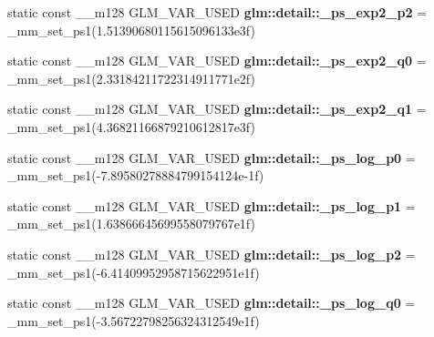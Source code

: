 \begin{DoxyCompactItemize}
\item 
\hypertarget{namespaceglm_1_1detail_a1f7d18bd6da7c5bdc5fe685841f8374f}{}static const \+\_\+\+\_\+m128 G\+L\+M\+\_\+\+V\+A\+R\+\_\+\+U\+S\+E\+D {\bfseries glm\+::detail\+::\+\_\+ps\+\_\+exp2\+\_\+p2} = \+\_\+mm\+\_\+set\+\_\+ps1(1.\+51390680115615096133e3f)\label{namespaceglm_1_1detail_a1f7d18bd6da7c5bdc5fe685841f8374f}

\item 
\hypertarget{namespaceglm_1_1detail_ab6388ad106523ea0b34984348ce3eaa0}{}static const \+\_\+\+\_\+m128 G\+L\+M\+\_\+\+V\+A\+R\+\_\+\+U\+S\+E\+D {\bfseries glm\+::detail\+::\+\_\+ps\+\_\+exp2\+\_\+q0} = \+\_\+mm\+\_\+set\+\_\+ps1(2.\+33184211722314911771e2f)\label{namespaceglm_1_1detail_ab6388ad106523ea0b34984348ce3eaa0}

\item 
\hypertarget{namespaceglm_1_1detail_a2792b1a9c82052110bf5c1daaa64ab42}{}static const \+\_\+\+\_\+m128 G\+L\+M\+\_\+\+V\+A\+R\+\_\+\+U\+S\+E\+D {\bfseries glm\+::detail\+::\+\_\+ps\+\_\+exp2\+\_\+q1} = \+\_\+mm\+\_\+set\+\_\+ps1(4.\+36821166879210612817e3f)\label{namespaceglm_1_1detail_a2792b1a9c82052110bf5c1daaa64ab42}

\item 
\hypertarget{namespaceglm_1_1detail_ac05e7617f086ccce8105e2ee2b9384b8}{}static const \+\_\+\+\_\+m128 G\+L\+M\+\_\+\+V\+A\+R\+\_\+\+U\+S\+E\+D {\bfseries glm\+::detail\+::\+\_\+ps\+\_\+log\+\_\+p0} = \+\_\+mm\+\_\+set\+\_\+ps1(-\/7.\+89580278884799154124e-\/1f)\label{namespaceglm_1_1detail_ac05e7617f086ccce8105e2ee2b9384b8}

\item 
\hypertarget{namespaceglm_1_1detail_a942d0536ea9f89c9c4d6450a3c65fad1}{}static const \+\_\+\+\_\+m128 G\+L\+M\+\_\+\+V\+A\+R\+\_\+\+U\+S\+E\+D {\bfseries glm\+::detail\+::\+\_\+ps\+\_\+log\+\_\+p1} = \+\_\+mm\+\_\+set\+\_\+ps1(1.\+63866645699558079767e1f)\label{namespaceglm_1_1detail_a942d0536ea9f89c9c4d6450a3c65fad1}

\item 
\hypertarget{namespaceglm_1_1detail_a0855c571c12733a94fc80bb32bb3dcac}{}static const \+\_\+\+\_\+m128 G\+L\+M\+\_\+\+V\+A\+R\+\_\+\+U\+S\+E\+D {\bfseries glm\+::detail\+::\+\_\+ps\+\_\+log\+\_\+p2} = \+\_\+mm\+\_\+set\+\_\+ps1(-\/6.\+41409952958715622951e1f)\label{namespaceglm_1_1detail_a0855c571c12733a94fc80bb32bb3dcac}

\item 
\hypertarget{namespaceglm_1_1detail_aae72ae6aa1a919887952615f74daa9fa}{}static const \+\_\+\+\_\+m128 G\+L\+M\+\_\+\+V\+A\+R\+\_\+\+U\+S\+E\+D {\bfseries glm\+::detail\+::\+\_\+ps\+\_\+log\+\_\+q0} = \+\_\+mm\+\_\+set\+\_\+ps1(-\/3.\+56722798256324312549e1f)\label{namespaceglm_1_1detail_aae72ae6aa1a919887952615f74daa9fa}


\end{DoxyCompactItemize}
